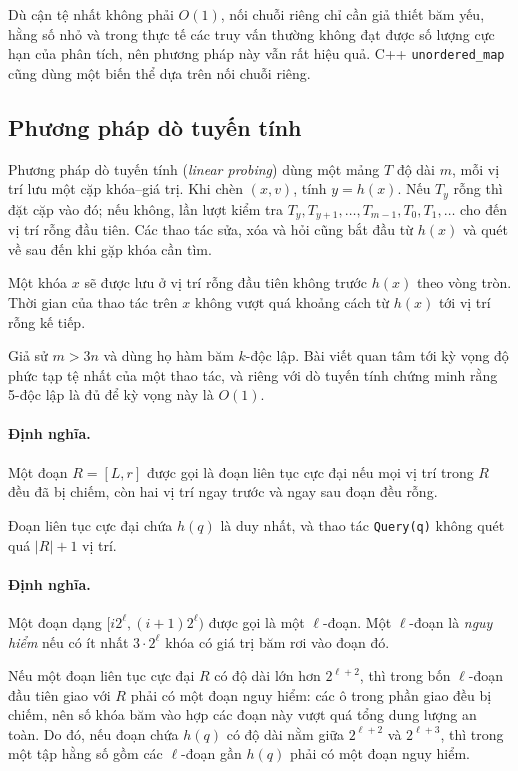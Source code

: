 \documentclass[11pt]{article}
\begin{document}
Dù cận tệ nhất không phải $O(1)$, nối chuỗi riêng chỉ cần giả thiết băm yếu,
hằng số nhỏ và trong thực tế các truy vấn thường không đạt được số lượng cực hạn
của phân tích, nên phương pháp này vẫn rất hiệu quả. C++ \texttt{unordered\_map}
cũng dùng một biến thể dựa trên nối chuỗi riêng.

\subsection{Phương pháp dò tuyến tính}

Phương pháp dò tuyến tính (\emph{linear probing}) dùng một mảng $T$ độ dài $m$,
mỗi vị trí lưu một cặp khóa--giá trị. Khi chèn $(x,v)$, tính $y=h(x)$. Nếu
$T_y$ rỗng thì đặt cặp vào đó; nếu không, lần lượt kiểm tra
$T_y,T_{y+1},\ldots,T_{m-1},T_0,T_1,\ldots$ cho đến vị trí rỗng đầu tiên. Các
thao tác sửa, xóa và hỏi cũng bắt đầu từ $h(x)$ và quét về sau đến khi gặp khóa
cần tìm.

Một khóa $x$ sẽ được lưu ở vị trí rỗng đầu tiên không trước $h(x)$ theo vòng
tròn. Thời gian của thao tác trên $x$ không vượt quá khoảng cách từ $h(x)$ tới
vị trí rỗng kế tiếp.

Giả sử $m>3n$ và dùng họ hàm băm $k$-độc lập. Bài viết quan tâm tới kỳ vọng độ
phức tạp tệ nhất của một thao tác, và riêng với dò tuyến tính chứng minh rằng
5-độc lập là đủ để kỳ vọng này là $O(1)$.

\paragraph{Định nghĩa.}
Một đoạn $R=[L,r]$ được gọi là đoạn liên tục cực đại nếu mọi vị trí trong $R$
đều đã bị chiếm, còn hai vị trí ngay trước và ngay sau đoạn đều rỗng.

Đoạn liên tục cực đại chứa $h(q)$ là duy nhất, và thao tác \texttt{Query(q)}
không quét quá $|R|+1$ vị trí.

\paragraph{Định nghĩa.}
Một đoạn dạng $[i2^\ell,(i+1)2^\ell)$ được gọi là một $\ell$-đoạn. Một
$\ell$-đoạn là \emph{nguy hiểm} nếu có ít nhất $3\cdot 2^\ell$ khóa có giá trị
băm rơi vào đoạn đó.

Nếu một đoạn liên tục cực đại $R$ có độ dài lớn hơn $2^{\ell+2}$, thì trong bốn
$\ell$-đoạn đầu tiên giao với $R$ phải có một đoạn nguy hiểm: các ô trong phần
giao đều bị chiếm, nên số khóa băm vào hợp các đoạn này vượt quá tổng dung lượng
an toàn. Do đó, nếu đoạn chứa $h(q)$ có độ dài nằm giữa $2^{\ell+2}$ và
$2^{\ell+3}$, thì trong một tập hằng số gồm các $\ell$-đoạn gần $h(q)$ phải có
một đoạn nguy hiểm.
\end{document}

